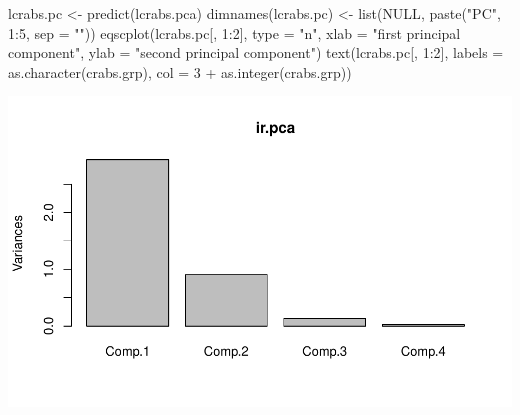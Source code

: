 \documentclass[
]{article}
\newenvironment{Shaded}{\begin{snugshade}}{\end{snugshade}}
\newcommand{\AttributeTok}[1]{\textcolor[rgb]{0.77,0.63,0.00}{#1}}
\newcommand{\ConstantTok}[1]{\textcolor[rgb]{0.00,0.00,0.00}{#1}}
\newcommand{\DecValTok}[1]{\textcolor[rgb]{0.00,0.00,0.81}{#1}}
\newcommand{\FunctionTok}[1]{\textcolor[rgb]{0.00,0.00,0.00}{#1}}
\newcommand{\NormalTok}[1]{#1}
\newcommand{\OtherTok}[1]{\textcolor[rgb]{0.56,0.35,0.01}{#1}}
\newcommand{\SpecialCharTok}[1]{\textcolor[rgb]{0.00,0.00,0.00}{#1}}
\newcommand{\StringTok}[1]{\textcolor[rgb]{0.31,0.60,0.02}{#1}}
\begin{document}
\begin{Shaded}
\begin{Highlighting}[]
\NormalTok{lcrabs.pc }\OtherTok{\textless{}{-}} \FunctionTok{predict}\NormalTok{(lcrabs.pca)}
\FunctionTok{dimnames}\NormalTok{(lcrabs.pc) }\OtherTok{\textless{}{-}} \FunctionTok{list}\NormalTok{(}\ConstantTok{NULL}\NormalTok{, }\FunctionTok{paste}\NormalTok{(}\StringTok{"PC"}\NormalTok{, }\DecValTok{1}\SpecialCharTok{:}\DecValTok{5}\NormalTok{, }\AttributeTok{sep =} \StringTok{""}\NormalTok{))}
\FunctionTok{eqscplot}\NormalTok{(lcrabs.pc[, }\DecValTok{1}\SpecialCharTok{:}\DecValTok{2}\NormalTok{], }\AttributeTok{type =} \StringTok{"n"}\NormalTok{,}
         \AttributeTok{xlab =} \StringTok{"first principal component"}\NormalTok{,}
         \AttributeTok{ylab =} \StringTok{"second principal component"}\NormalTok{)}
\FunctionTok{text}\NormalTok{(lcrabs.pc[, }\DecValTok{1}\SpecialCharTok{:}\DecValTok{2}\NormalTok{], }\AttributeTok{labels =} \FunctionTok{as.character}\NormalTok{(crabs.grp),}
     \AttributeTok{col =} \DecValTok{3} \SpecialCharTok{+} \FunctionTok{as.integer}\NormalTok{(crabs.grp)) }
\end{Highlighting}
\end{Shaded}

\includegraphics{modern_applied_statistics_CH11_files/figure-latex/unnamed-chunk-5-1.pdf}
\end{document}
